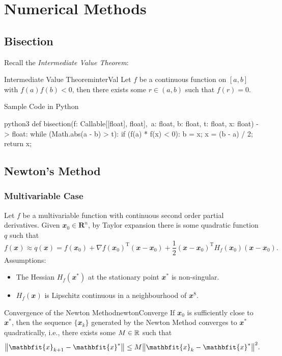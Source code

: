 \documentclass[math, code]{amznotes}
\theoremstyle{remark}
\begin{document}
\chapter{Numerical Methods}
\section{Bisection}
Recall the \textit{Intermediate Value Theorem}:
\begin{thmbox}{Intermediate Value Theorem}{interVal}
    Let $f$ be a continuous function on $[a, b]$ with $f(a)f(b) < 0$, then there exists some $r \in (a, b)$ such that $f(r) = 0$.
\end{thmbox}
\begin{codebox}{Sample Code in Python}{}
    \begin{amzcode}{python3}
        def bisection(f: Callable[[float], float],\
            a: float, b: float, t: float, x: float) -> float:
            while (Math.abs(a - b) > t):
                if (f(a) * f(x) < 0):
                    b = x;
                    x = (b - a) / 2;
            return x;
    \end{amzcode}
\end{codebox}

\section{Newton's Method}
\subsection{Multivariable Case}
Let $f$ be a multivariable function with continuous second order partial derivatives. Given $\mathbfit{x_0} \in \mathbf{R}^n$, by Taylor expansion there is some quadratic function $q$ such that
\begin{equation*}
    f(\mathbfit{x}) \approx q(\mathbfit{x}) = f(\mathbfit{x}_0) + \nabla f(\mathbfit{x}_0)^{\mathrm{T}}(\mathbfit{x} - \mathbfit{x}_0) + \frac{1}{2}(\mathbfit{x} - \mathbfit{x}_0)^{\mathrm{T}}H_f(\mathbfit{x}_0)(\mathbfit{x} - \mathbfit{x}_0).
\end{equation*}
Assumptions:
\begin{itemize}
    \item The Hessian $H_f(\mathbfit{x}^*)$ at the stationary point $\mathbfit{x}^*$ is non-singular.
    \item $H_f(\mathbfit{x})$ is Lipschitz continuous in a neighbourhood of $\mathbfit{x}^8$.
\end{itemize}
\begin{probox}{Convergence of the Newton Method}{newtonConverge}
    If $\mathbfit{x}_0$ is sufficiently close to $\mathbfit{x}^*$, then the sequence $\{\mathbfit{x}_k\}$ generated by the Newton Method converges to $\mathbfit{x}^*$ quadratically, i.e., there exists some $M \in \mathbb{R}$ such that
    \begin{equation*}
        \norm{\mathbfit{x}_{k + 1} - \mathbfit{x}^*} \leq M\norm{\mathbfit{x}_k - \mathbfit{x}^*}^2.
    \end{equation*}
\end{probox}
\end{document}
